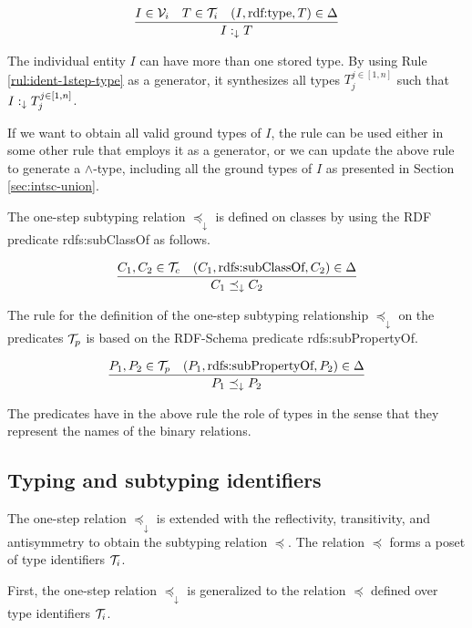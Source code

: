 \documentclass[runningheads]{llncs}
\newcommand{\darr}{\downarrow}
\newcommand{\V}{{\cal V}}
\newcommand{\T}{{\cal T}}
\begin{document}
\begin{equation}
\label{rul:ident-1step-type}
\dfrac{I\in\V_i\quad T\in\T_i\quad (I,\text{rdf:type},T)\in\D}
      {I :_\darr T}
\end{equation}

The individual entity $I$ can have more than one stored type. By
using Rule \ref{rul:ident-1step-type} as a generator, it synthesizes
all types $T_j^{j\in[1,n]}$ such that $I:_\darr\/T_j^{j\in[1,n]}$.

If we want to obtain all valid ground types of $I$, the rule can be
used either in some other rule that employs it as a generator, or we
can update the above rule to generate a $\land$-type, including all
the ground types of $I$ as presented in Section \ref{sec:intsc-union}.

The one-step subtyping relation $\preceq_\darr$ is defined on
classes by using the RDF predicate rdfs:sub\-ClassOf as follows.

\begin{equation}
\label{rul:ident-1step-subtype}
\dfrac{C_1,C_2\in\T_c\quad (C_1,\text{rdfs:subClassOf},C_2)\in\D}
{C_1 \preceq_\darr\/C_2}
\end{equation}

The rule for the definition of the one-step subtyping relationship
$\preceq_\darr$ on the predicates $\T_p$ is based on the RDF-Schema
predicate rdfs:subPropertyOf.

\begin{equation}
\dfrac{P_1,P_2\in\T_p \quad (P_1,\text{rdfs:subPropertyOf},P_2)\in\D}
      {P_1\preceq_\darr\/P_2}
\end{equation}

The predicates have in the above rule the role of types in the sense
that they represent the names of the binary relations. 



\subsection{Typing and subtyping identifiers\label{sec:idents-typing}}

The one-step relation $\preceq_\darr$ is extended with the
reflectivity, transitivity, and antisymmetry to obtain the subtyping
relation $\preceq$. The relation $\preceq$ forms a poset of type
identifiers $\T_i$.

First, the one-step relation $\preceq_\darr$ is generalized to the
relation $\preceq$ defined over type identifiers $\T_i$.
\end{document}
